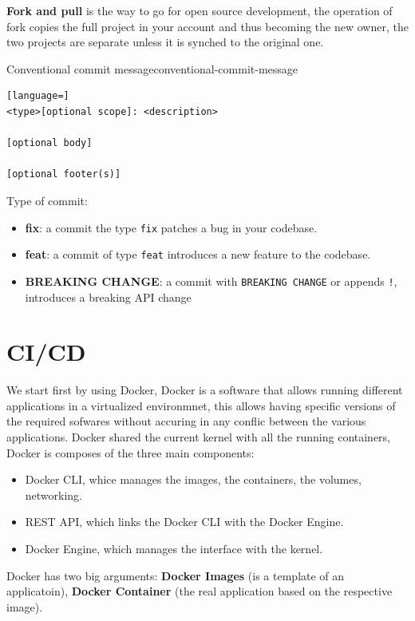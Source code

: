 \documentclass[12pt]{article}
\begin{document}
\textbf{Fork and pull} is the way to go for open source development, the operation of fork copies the full project in your account and thus becoming the new owner, the two projects are separate unless it is synched to the original one.
\begin{definition}{Conventional commit message}{conventional-commit-message}
\begin{lstlisting}[language=]
<type>[optional scope]: <description>

[optional body]

[optional footer(s)]
\end{lstlisting}
  Type of commit: 
  \begin{itemize}
    \item \textbf{fix}: a commit the type \texttt{fix} patches a bug in your codebase.
    \item \textbf{feat}: a commit of type \texttt{feat} introduces a new feature to the codebase.
    \item \textbf{BREAKING CHANGE}: a commit with \texttt{BREAKING CHANGE} or appends \texttt{!}, introduces a breaking API change
  \end{itemize}
\end{definition}


\newpage
\section{CI/CD}
We start first by using Docker, Docker is a software that allows running different applications in a virtualized environmnet, this allows having specific versions of the required sofwares without accuring in any conflic between the various applications. Docker shared the current kernel with all the running containers, Docker is composes of the three main components:
\begin{itemize}
  \item Docker CLI, whice manages the images, the containers, the volumes, networking.
  \item REST API, which links the Docker CLI with the Docker Engine.
  \item Docker Engine, which manages the interface with the kernel.
\end{itemize}
Docker has two big arguments: \textbf{Docker Images} (is a template of an applicatoin), \textbf{Docker Container} (the real application based on the respective image).
\end{document}
